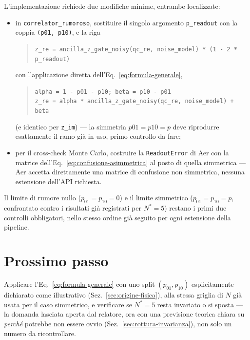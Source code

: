 \documentclass[11pt,a4paper]{article}
\begin{document}
L'implementazione richiede due modifiche minime, entrambe localizzate:
\begin{itemize}[leftmargin=1.3em,itemsep=0.25em]
\item in \texttt{correlator\_rumoroso}, sostituire il singolo argomento
\texttt{p\_readout} con la coppia \texttt{(p01, p10)}, e la riga
\begin{quote}
\texttt{z\_re = ancilla\_z\_gate\_noisy(qc\_re, noise\_model) * (1 - 2 * p\_readout)}
\end{quote}
con l'applicazione diretta dell'Eq.~\eqref{eq:formula-generale},
\begin{quote}
\texttt{alpha = 1 - p01 - p10; beta = p10 - p01}\\
\texttt{z\_re = alpha * ancilla\_z\_gate\_noisy(qc\_re, noise\_model) + beta}
\end{quote}
(e identico per \texttt{z\_im}) --- la simmetria $p01=p10=p$ deve
riprodurre esattamente il ramo già in uso, primo controllo da fare;
\item per il cross-check Monte Carlo, costruire la
\texttt{ReadoutError} di Aer con la matrice
dell'Eq.~\eqref{eq:confusione-asimmetrica} al posto di quella simmetrica
--- Aer accetta direttamente una matrice di confusione non simmetrica,
nessuna estensione dell'API richiesta.
\end{itemize}
Il limite di rumore nullo ($p_{01}=p_{10}=0$) e il limite simmetrico
($p_{01}=p_{10}=p$, confrontato contro i risultati già registrati per
$N^*=5$) restano i primi due controlli obbligatori, nello stesso ordine
già seguito per ogni estensione della pipeline.

\section{Prossimo passo}

Applicare l'Eq.~\eqref{eq:formula-generale} con uno split $(p_{01},p_{10})$
esplicitamente dichiarato come illustrativo (Sez.~\ref{sec:origine-fisica}),
alla stessa griglia di $N$ già usata per il caso simmetrico, e verificare
se $N^*=5$ resta invariato o si sposta --- la domanda lasciata aperta dal
relatore, ora con una previsione teorica chiara su \emph{perché} potrebbe
non essere ovvio (Sez.~\ref{sec:rottura-invarianza}), non solo un numero
da ricontrollare.
\end{document}

